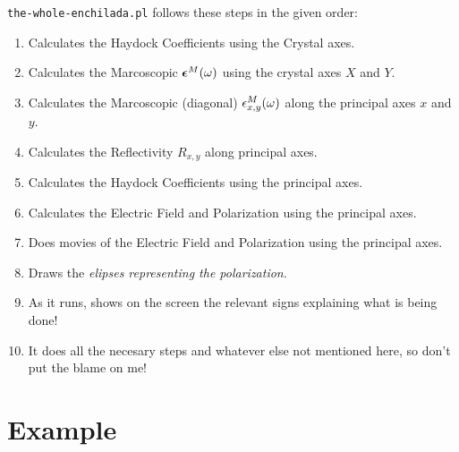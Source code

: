 \documentclass[preprint,12pt]{revtex4}
\begin{document}
\verb=the-whole-enchilada.pl=  follows these steps in the given order:
\begin{enumerate}
\item Calculates the Haydock Coefficients using the Crystal axes. 
\item Calculates the Marcoscopic $\boldsymbol{\epsilon}^M(\omega)$ using the crystal axes
  $X$ and $Y$.
\item Calculates the Marcoscopic (diagonal) $\epsilon^M_{x,y}(\omega)$ along the
  principal axes $x$ and $y$.
\item Calculates the Reflectivity $R_{x,y}$ along principal axes.
\item Calculates the Haydock Coefficients using the principal axes. 
\item Calculates the Electric Field  and Polarization using the principal axes. 
\item Does movies of the Electric Field  and Polarization using the
  principal axes.
\item Draws the {\it elipses representing the polarization}.
\item As it runs, shows on the screen the relevant signs explaining
  what is being done!
\item It does all the necesary steps and whatever else not mentioned
  here, so don't put the blame on me!   
\end{enumerate}

\section{Example}\label{sec:example}
\end{document}
